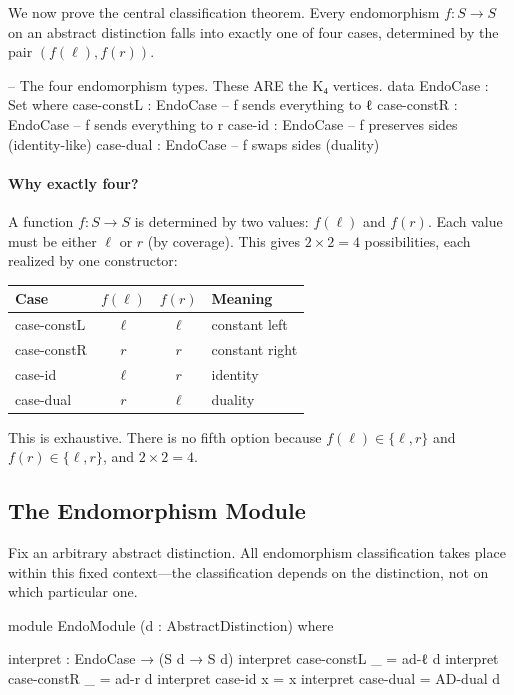 \documentclass[11pt,a4paper]{book}
\def\texttt#1{#1}%
\begin{document}
We now prove the central classification theorem. Every endomorphism
$f : S \to S$ on an abstract distinction falls into exactly one of four cases,
determined by the pair $(f(\ell), f(r))$.

\begin{code}
-- The four endomorphism types. These ARE the K₄ vertices.
data EndoCase : Set where
  case-constL : EndoCase   -- f sends everything to ℓ
  case-constR : EndoCase   -- f sends everything to r
  case-id     : EndoCase   -- f preserves sides (identity-like)
  case-dual   : EndoCase   -- f swaps sides (duality)
\end{code}

\paragraph{Why exactly four?}
A function $f : S \to S$ is determined by two values: $f(\ell)$ and $f(r)$.
Each value must be either $\ell$ or $r$ (by coverage). This gives $2 \times 2 = 4$
possibilities, each realized by one constructor:
\begin{center}
\begin{tabular}{lccl}
\toprule
\textbf{Case} & $f(\ell)$ & $f(r)$ & \textbf{Meaning} \\
\midrule
\texttt{case-constL} & $\ell$ & $\ell$ & constant left \\
\texttt{case-constR} & $r$ & $r$ & constant right \\
\texttt{case-id}     & $\ell$ & $r$ & identity \\
\texttt{case-dual}   & $r$ & $\ell$ & duality \\
\bottomrule
\end{tabular}
\end{center}

This is exhaustive. There is no fifth option because $f(\ell) \in \{\ell, r\}$
and $f(r) \in \{\ell, r\}$, and $2 \times 2 = 4$.

\subsection{The Endomorphism Module}

Fix an arbitrary abstract distinction. All endomorphism classification takes place
within this fixed context---the classification depends on the distinction, not on
which particular one.

\begin{code}
module EndoModule (d : AbstractDistinction) where

  interpret : EndoCase → (S d → S d)
  interpret case-constL _ = ad-ℓ d
  interpret case-constR _ = ad-r d
  interpret case-id     x = x
  interpret case-dual     = AD-dual d
\end{code}
\end{document}
